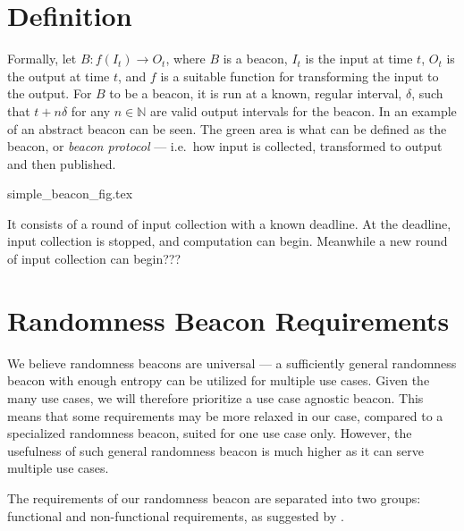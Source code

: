 \section{Definition}


Formally, let $B: f(I_t) \rightarrow O_t$, where $B$ is a beacon, $I_t$ is the input at time $t$, $O_t$ is the output at time $t$, and $f$ is a suitable function for transforming the input to the output.
For $B$ to be a beacon, it is run at a known, regular interval, $\delta$, such that $t+n\delta$ for any $n \in \mathbb{N}$ are valid output intervals for the beacon.
In  an example of an abstract beacon can be seen.
The green area is what can be defined as the beacon, or \emph{beacon protocol} --- i.e.\ how input is collected, transformed to output and then published.

{simple_beacon_fig.tex}


It consists of a round of input collection with a known deadline. At the deadline, input collection is stopped, and computation can begin. Meanwhile a new round of input collection can begin???

\section{Randomness Beacon Requirements}
\label{sec:beacon_requirements}

We believe randomness beacons are universal --- a sufficiently general randomness beacon with enough entropy can be utilized for multiple use cases. Given the many use cases, we will therefore prioritize a use case agnostic beacon.
This means that some requirements may be more relaxed in our case, compared to a specialized randomness beacon, suited for one use case only. However, the usefulness of such general randomness beacon is much higher as it can serve multiple use cases.

The requirements of our randomness beacon are separated into two groups: functional and non-functional requirements, as suggested by \citet[sec.\ 1.4.1]{swebok} .

